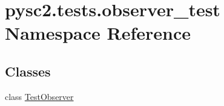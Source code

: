 \hypertarget{namespacepysc2_1_1tests_1_1observer__test}{}\section{pysc2.\+tests.\+observer\+\_\+test Namespace Reference}
\label{namespacepysc2_1_1tests_1_1observer__test}
\subsection*{Classes}
\begin{DoxyCompactItemize}
\item 
class \mbox{\hyperlink{classpysc2_1_1tests_1_1observer__test_1_1_test_observer}{Test\+Observer}}
\end{DoxyCompactItemize}
